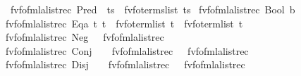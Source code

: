 \begin{isabellebody}
\ \ {\isachardoublequoteopen}fv{\isacharunderscore}{\kern0pt}fo{\isacharunderscore}{\kern0pt}fmla{\isacharunderscore}{\kern0pt}list{\isacharunderscore}{\kern0pt}rec\ {\isacharparenleft}{\kern0pt}Pred\ {\isacharunderscore}{\kern0pt}\ ts{\isacharparenright}{\kern0pt}\ {\isacharequal}{\kern0pt}\ fv{\isacharunderscore}{\kern0pt}fo{\isacharunderscore}{\kern0pt}terms{\isacharunderscore}{\kern0pt}list\ ts{\isachardoublequoteclose}\isanewline
{\isacharbar}{\kern0pt}\ {\isachardoublequoteopen}fv{\isacharunderscore}{\kern0pt}fo{\isacharunderscore}{\kern0pt}fmla{\isacharunderscore}{\kern0pt}list{\isacharunderscore}{\kern0pt}rec\ {\isacharparenleft}{\kern0pt}Bool\ b{\isacharparenright}{\kern0pt}\ {\isacharequal}{\kern0pt}\ {\isacharbrackleft}{\kern0pt}{\isacharbrackright}{\kern0pt}{\isachardoublequoteclose}\isanewline
{\isacharbar}{\kern0pt}\ {\isachardoublequoteopen}fv{\isacharunderscore}{\kern0pt}fo{\isacharunderscore}{\kern0pt}fmla{\isacharunderscore}{\kern0pt}list{\isacharunderscore}{\kern0pt}rec\ {\isacharparenleft}{\kern0pt}Eqa\ t\ t{\isacharprime}{\kern0pt}{\isacharparenright}{\kern0pt}\ {\isacharequal}{\kern0pt}\ fv{\isacharunderscore}{\kern0pt}fo{\isacharunderscore}{\kern0pt}term{\isacharunderscore}{\kern0pt}list\ t\ {\isacharat}{\kern0pt}\ fv{\isacharunderscore}{\kern0pt}fo{\isacharunderscore}{\kern0pt}term{\isacharunderscore}{\kern0pt}list\ t{\isacharprime}{\kern0pt}{\isachardoublequoteclose}\isanewline
{\isacharbar}{\kern0pt}\ {\isachardoublequoteopen}fv{\isacharunderscore}{\kern0pt}fo{\isacharunderscore}{\kern0pt}fmla{\isacharunderscore}{\kern0pt}list{\isacharunderscore}{\kern0pt}rec\ {\isacharparenleft}{\kern0pt}Neg\ {\isasymphi}{\isacharparenright}{\kern0pt}\ {\isacharequal}{\kern0pt}\ fv{\isacharunderscore}{\kern0pt}fo{\isacharunderscore}{\kern0pt}fmla{\isacharunderscore}{\kern0pt}list{\isacharunderscore}{\kern0pt}rec\ {\isasymphi}{\isachardoublequoteclose}\isanewline
{\isacharbar}{\kern0pt}\ {\isachardoublequoteopen}fv{\isacharunderscore}{\kern0pt}fo{\isacharunderscore}{\kern0pt}fmla{\isacharunderscore}{\kern0pt}list{\isacharunderscore}{\kern0pt}rec\ {\isacharparenleft}{\kern0pt}Conj\ {\isasymphi}\ {\isasympsi}{\isacharparenright}{\kern0pt}\ {\isacharequal}{\kern0pt}\ fv{\isacharunderscore}{\kern0pt}fo{\isacharunderscore}{\kern0pt}fmla{\isacharunderscore}{\kern0pt}list{\isacharunderscore}{\kern0pt}rec\ {\isasymphi}\ {\isacharat}{\kern0pt}\ fv{\isacharunderscore}{\kern0pt}fo{\isacharunderscore}{\kern0pt}fmla{\isacharunderscore}{\kern0pt}list{\isacharunderscore}{\kern0pt}rec\ {\isasympsi}{\isachardoublequoteclose}\isanewline
{\isacharbar}{\kern0pt}\ {\isachardoublequoteopen}fv{\isacharunderscore}{\kern0pt}fo{\isacharunderscore}{\kern0pt}fmla{\isacharunderscore}{\kern0pt}list{\isacharunderscore}{\kern0pt}rec\ {\isacharparenleft}{\kern0pt}Disj\ {\isasymphi}\ {\isasympsi}{\isacharparenright}{\kern0pt}\ {\isacharequal}{\kern0pt}\ fv{\isacharunderscore}{\kern0pt}fo{\isacharunderscore}{\kern0pt}fmla{\isacharunderscore}{\kern0pt}list{\isacharunderscore}{\kern0pt}rec\ {\isasymphi}\ {\isacharat}{\kern0pt}\ fv{\isacharunderscore}{\kern0pt}fo{\isacharunderscore}{\kern0pt}fmla{\isacharunderscore}{\kern0pt}list{\isacharunderscore}{\kern0pt}rec\ {\isasympsi}{\isachardoublequoteclose}\isanewline

\end{isabellebody}
